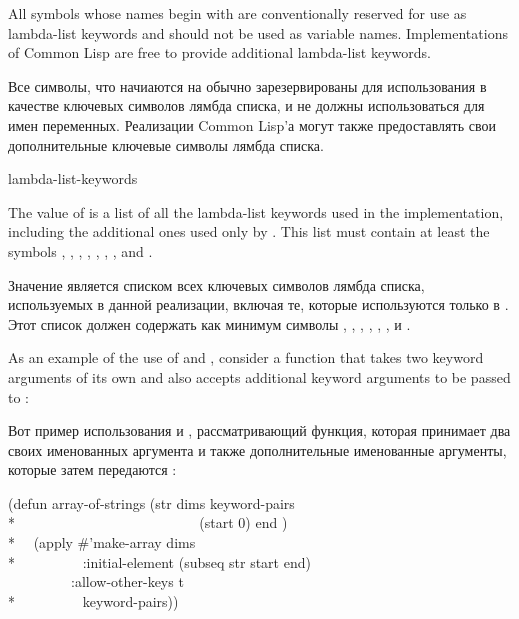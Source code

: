 All symbols whose names begin with \cd{\&} are conventionally reserved
for use as lambda-list keywords and should not be used as variable names.
Implementations of Common Lisp are free to provide additional lambda-list
keywords.

Все символы, что начиаются на \cd{\&} обычно зарезервированы для использования в
качестве ключевых символов лямбда списка, и не должны использоваться для имен
переменных.
Реализации Common Lisp'а могут также предоставлять свои дополнительные ключевые
символы лямбда списка.

\begin{defun}[Constant]
lambda-list-keywords

The value of  is a list of all the lambda-list
keywords used in the implementation, including the additional ones
used only by .  This list must contain at least the symbols
, , , , , , ,
and .

Значение  является списком всех ключевых символов
лямбда списка, используемых в данной реализации, включая те, которые
используются только в . Этот список должен содержать как минимум
символы , , , , , , 
и .
\end{defun}

As an example of the use of  and ,
consider a function that takes two keyword arguments of its own and also
accepts additional keyword arguments to be passed to :

Вот пример использования  и , 
рассматривающий функция, которая принимает два своих именованных аргумента и
также дополнительные именованные аргументы, которые затем передаются
:

\begin{lisp}
(defun array-of-strings (str dims  keyword-pairs \\*
~~~~~~~~~~~~~~~~~~~~~~~~~ (start 0) end ) \\*
~~(apply \#'make-array dims \\*
~~~~~~~~~:initial-element (subseq str start end) \\
~~~~~~~~~:allow-other-keys t \\*
~~~~~~~~~keyword-pairs))
\end{lisp}

